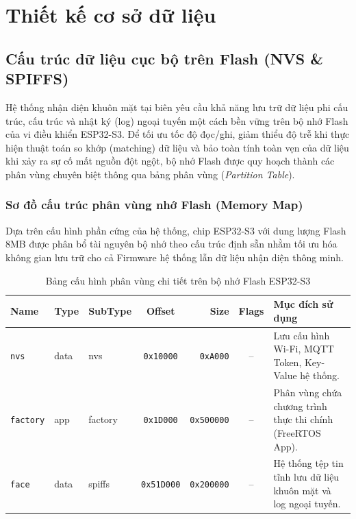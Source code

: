 \section{Thiết kế cơ sở dữ liệu}

\subsection{Cấu trúc dữ liệu cục bộ trên Flash (NVS \& SPIFFS)}

Hệ thống nhận diện khuôn mặt tại biên yêu cầu khả năng lưu trữ dữ liệu phi cấu trúc, cấu trúc và nhật ký (log) ngoại tuyến một cách bền vững trên bộ nhớ Flash của vi điều khiển ESP32-S3. Để tối ưu tốc độ đọc/ghi, giảm thiểu độ trễ khi thực hiện thuật toán so khớp (matching) dữ liệu và bảo toàn tính toàn vẹn của dữ liệu khi xảy ra sự cố mất nguồn đột ngột, bộ nhớ Flash được quy hoạch thành các phân vùng chuyên biệt thông qua bảng phân vùng (\textit{Partition Table}).

\subsubsection{Sơ đồ cấu trúc phân vùng nhớ Flash (Memory Map)}

Dựa trên cấu hình phần cứng của hệ thống, chip ESP32-S3 với dung lượng Flash 8MB được phân bổ tài nguyên bộ nhớ theo cấu trúc định sẵn nhằm tối ưu hóa không gian lưu trữ cho cả Firmware hệ thống lẫn dữ liệu nhận diện thông minh.

\begin{table}[H]
    \centering
    \caption{Bảng cấu hình phân vùng chi tiết trên bộ nhớ Flash ESP32-S3}
    \label{tab:partition_table}
    \small
    \begin{tabularx}{\textwidth}{lllcrcX}
\toprule
\textbf{Name} & \textbf{Type} & \textbf{SubType} & \textbf{Offset} & \textbf{Size} & \textbf{Flags} & \textbf{Mục đích sử dụng} \\
\midrule
\texttt{nvs}      & data & nvs      & \texttt{0x10000}  & \texttt{0xA000}   & -- & Lưu cấu hình Wi-Fi, MQTT Token, Key-Value hệ thống. \\
\texttt{factory}  & app  & factory  & \texttt{0x1D000}  & \texttt{0x500000} & -- & Phân vùng chứa chương trình thực thi chính (FreeRTOS App). \\
\texttt{face}     & data & spiffs   & \texttt{0x51D000} & \texttt{0x200000} & -- & Hệ thống tệp tin tĩnh lưu dữ liệu khuôn mặt và log ngoại tuyến. \\
\bottomrule
    \end{tabularx}
\end{table}



